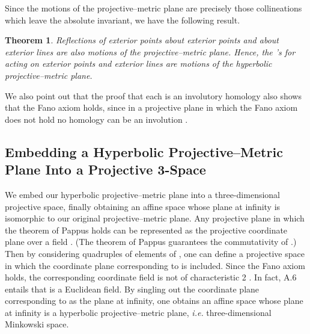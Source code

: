 \documentclass[a4paper,twoside,12pt]{article}
\newtheorem{theorem}{Theorem}[section]
\begin{document}
     Since the motions of the projective--metric plane are precisely those
collineations which leave the absolute invariant, we have the 
following result.

\begin{theorem} Reflections of exterior points about exterior points
and about exterior lines are also motions of the projective--metric plane.
Hence, the \coordHE{}'s for \coordHE{} acting on exterior points
and exterior lines are motions of the hyperbolic projective--metric plane.
\end{theorem} 

     We also point out that the proof that each \coordHE{} is an involutory
homology also shows that the Fano axiom holds, since in a projective plane
in which the Fano axiom does not hold no homology can be an involution 
\cite{BL}.


\subsection{Embedding a Hyperbolic Projective--Metric Plane Into a Projective
3-Space}

     We embed our hyperbolic projective--metric plane into a
three-dimensional projective space, finally obtaining an affine space
whose plane at infinity is isomorphic to our original
projective--metric plane. Any projective plane \myHighlight{$\Pi$}\coordHE{} in which the
theorem of Pappus holds can be represented as the projective
coordinate plane over a field \coordHE{}. (The theorem of Pappus
guarantees the commutativity of \coordHE{}.) Then by considering
quadruples of elements of \coordHE{}, one can define a projective
space \coordHE{} in which the coordinate plane corresponding
to \myHighlight{$\Pi$}\coordHE{} is included. Since the Fano axiom holds, the corresponding
coordinate field \coordHE{} is not of characteristic 2
\cite{BL}. In fact, A.6 entails that \coordHE{} is a Euclidean
field. By singling out the coordinate plane corresponding to \myHighlight{$\Pi$}\coordHE{}
as the plane at infinity, one obtains an affine space whose plane at
infinity is a hyperbolic projective--metric plane, {\it i.e.}
three-dimensional Minkowski space.
\end{document}
